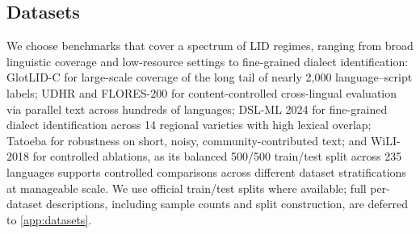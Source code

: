 \documentclass{article}
\newcommand{\note}[4][]{\todo[author=#2,color=#3,size=\scriptsize,fancyline,caption={},#1]{#4}} %
\newcommand{\clara}[2][]{\note[#1]{\textbf{Clara}}{orange!30}{#2}}
\begin{document}
\subsection{Datasets}

We choose benchmarks that cover a spectrum of LID regimes, ranging from broad linguistic coverage and low-resource settings to fine-grained dialect identification: GlotLID-C \citep{kargaran-etal-2023-glotlid} for large-scale coverage of
the long tail of nearly 2{,}000 language--script labels;
UDHR \citep{Vatanen10LREC} and FLORES-200 \citep{nllb2022}
for content-controlled cross-lingual evaluation via parallel text across
hundreds of languages;
DSL-ML 2024 \citep{chifu-etal-2024-vardial} for fine-grained dialect
identification across 14 regional varieties with high lexical overlap;
Tatoeba \citep{tiedemann-2020-tatoeba} for robustness on short, noisy,
community-contributed text;
and WiLI-2018 \citep{Thoma2018TheWB} for controlled ablations, as its
balanced 500/500 train/test split across 235 languages supports
controlled comparisons across different dataset stratifications  at
manageable scale. We use official train/test splits where available; full
per-dataset descriptions, including sample counts and split construction,
are deferred to \cref{app:datasets}.
\end{document}
